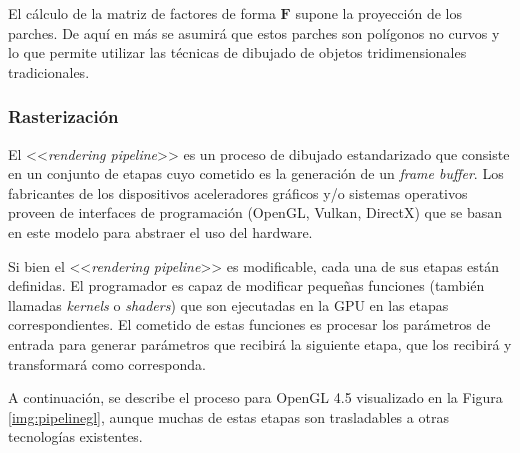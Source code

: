 El cálculo de la matriz de factores de forma $\mathbf{F}$ supone la proyección de los parches. De aquí en más se asumirá que estos parches son polígonos no curvos y lo que permite utilizar las técnicas de dibujado de objetos tridimensionales tradicionales.

\subsubsection{Rasterización}
\label{sec:rasterizacion}

El <<\textit{rendering pipeline}>> es un proceso de dibujado estandarizado que consiste en un conjunto de etapas cuyo cometido es la generación de un \textit{frame buffer}. Los fabricantes de los dispositivos aceleradores gráficos y/o sistemas operativos proveen de interfaces de programación (OpenGL, Vulkan, DirectX) que se basan en este modelo para abstraer el uso del hardware.

Si bien el <<\textit{rendering pipeline}>> es modificable, cada una de sus etapas están definidas.  El programador es capaz de modificar pequeñas funciones (también llamadas \textit{kernels} o \textit{shaders}) que son ejecutadas en la GPU en las etapas correspondientes. El cometido de estas funciones es procesar los parámetros de entrada para generar parámetros que recibirá la siguiente etapa, que los recibirá y transformará como corresponda.

A continuación, se describe el proceso para OpenGL 4.5 visualizado en la Figura \ref{img:pipelinegl}, aunque muchas de estas etapas son trasladables a otras tecnologías existentes.

